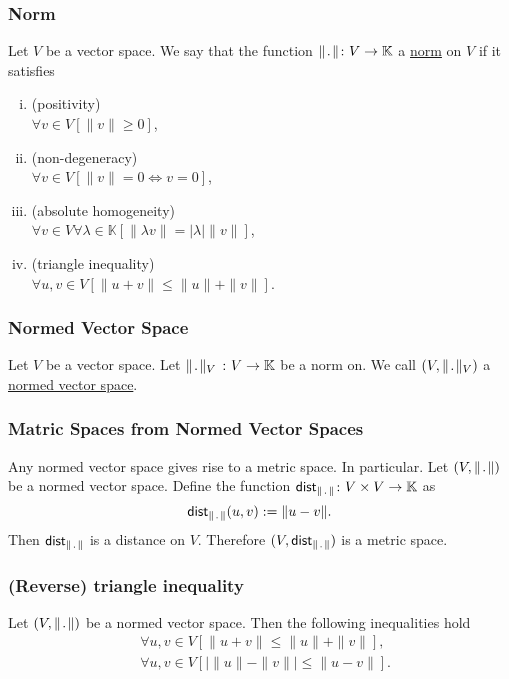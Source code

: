 \subsubsection*{Norm}
\udef Let $V$ be a vector space. We say that the function
$\norm \colon V \to \mathbb{K}$ a \ul{norm} on $V$ if it satisfies
\begin{enumerate}[(i)]
    \item (positivity)\\ $\forall v \in V \left[ \| v \| \geq 0 \right]$,
    \item (non-degeneracy)\\ $\forall v \in V \left[ \| v \| = 0 \iff v = 0 \right]$,
    \item (absolute homogeneity)\\ $\forall v \in V \forall \lambda \in \mathbb{K}
        \left[ \| \lambda v \| = | \lambda | \| v \| \right]$,
    \item (triangle inequality)\\ $\forall u, v \in V \left[ 
        \| u + v \| \leq \| u \| + \| v \| \right]$.
\end{enumerate}


\subsubsection*{Normed Vector Space}
\udef Let $V$ be a vector space.
Let $\norm_V\ \colon V \to \mathbb{K}$ be a norm on.
We call $(V, \norm_V)$ a \ul{normed vector space}.


\subsubsection*{Matric Spaces from Normed Vector Spaces}
\uprop Any normed vector space gives rise to a metric space.
In particular. Let $(V, \norm)$ be a normed vector space. Define
the function $\distnorm \colon V \times V \to \mathbb{K}$ as
\[
    \distnorm(u,v) := \| u - v \|.
\]
Then $\distnorm$ is a distance on $V$. Therefore $(V, \distnorm)$ is a metric space.


\subsubsection*{(Reverse) triangle inequality}
Let $(V, \norm)$ be a normed vector space. 
Then the following inequalities hold
\begin{align*}
    & \forall u,v \in V \left[ \| u + v \| \leq \| u \| + \| v \| \right],\\
    & \forall u,v \in V \left[ | \| u \| - \| v \| | \leq \| u - v \| \right].
\end{align*}
